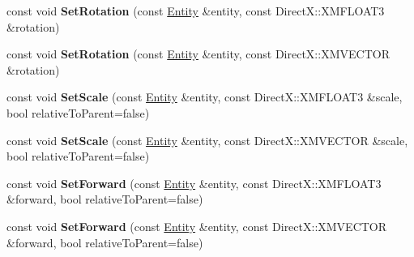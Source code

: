 \begin{DoxyCompactItemize}
\item 
const void {\bfseries Set\+Rotation} (const \hyperlink{struct_ensum_1_1_components_1_1_entity}{Entity} \&entity, const Direct\+X\+::\+X\+M\+F\+L\+O\+A\+T3 \&rotation)\hypertarget{class_ensum_1_1_components_1_1_transform_manager_ac770f58d61a7369814e607b43072824f}{}\label{class_ensum_1_1_components_1_1_transform_manager_ac770f58d61a7369814e607b43072824f}

\item 
const void {\bfseries Set\+Rotation} (const \hyperlink{struct_ensum_1_1_components_1_1_entity}{Entity} \&entity, const Direct\+X\+::\+X\+M\+V\+E\+C\+T\+OR \&rotation)\hypertarget{class_ensum_1_1_components_1_1_transform_manager_a2a4e2c7374de1f26f6ac7fca0b22c9de}{}\label{class_ensum_1_1_components_1_1_transform_manager_a2a4e2c7374de1f26f6ac7fca0b22c9de}

\item 
const void {\bfseries Set\+Scale} (const \hyperlink{struct_ensum_1_1_components_1_1_entity}{Entity} \&entity, const Direct\+X\+::\+X\+M\+F\+L\+O\+A\+T3 \&scale, bool relative\+To\+Parent=false)\hypertarget{class_ensum_1_1_components_1_1_transform_manager_a0b4cf5a20533bf1efb65fbc0e9c9d3bf}{}\label{class_ensum_1_1_components_1_1_transform_manager_a0b4cf5a20533bf1efb65fbc0e9c9d3bf}

\item 
const void {\bfseries Set\+Scale} (const \hyperlink{struct_ensum_1_1_components_1_1_entity}{Entity} \&entity, const Direct\+X\+::\+X\+M\+V\+E\+C\+T\+OR \&scale, bool relative\+To\+Parent=false)\hypertarget{class_ensum_1_1_components_1_1_transform_manager_afc32dc7d90e2a180f2d8cf0d5838fbc0}{}\label{class_ensum_1_1_components_1_1_transform_manager_afc32dc7d90e2a180f2d8cf0d5838fbc0}

\item 
const void {\bfseries Set\+Forward} (const \hyperlink{struct_ensum_1_1_components_1_1_entity}{Entity} \&entity, const Direct\+X\+::\+X\+M\+F\+L\+O\+A\+T3 \&forward, bool relative\+To\+Parent=false)\hypertarget{class_ensum_1_1_components_1_1_transform_manager_ac6f1ab9da36867b8ceadf235e1029893}{}\label{class_ensum_1_1_components_1_1_transform_manager_ac6f1ab9da36867b8ceadf235e1029893}

\item 
const void {\bfseries Set\+Forward} (const \hyperlink{struct_ensum_1_1_components_1_1_entity}{Entity} \&entity, const Direct\+X\+::\+X\+M\+V\+E\+C\+T\+OR \&forward, bool relative\+To\+Parent=false)\hypertarget{class_ensum_1_1_components_1_1_transform_manager_ab28a6fe03a0e3da6098006e52655a924}{}\label{class_ensum_1_1_components_1_1_transform_manager_ab28a6fe03a0e3da6098006e52655a924}


\end{DoxyCompactItemize}

